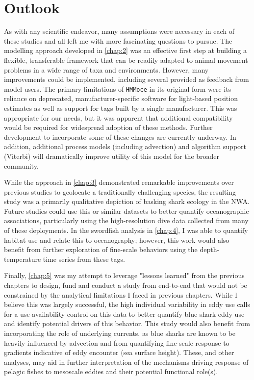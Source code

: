 \section{Outlook}
As with any scientific endeavor, many assumptions were necessary in each of these studies and all left me with more fascinating questions to pursue. The modelling approach developed in \cref{chap:2} was an effective first step at building a flexible, transferable framework that can be readily adapted to animal movement problems in a wide range of taxa and environments. However, many improvements could be implemented, including several provided as feedback from model users. The primary limitations of \texttt{HMMoce} in its original form were its reliance on deprecated, manufacturer-specific software for light-based position estimates as well as support for tags built by a single manufacturer. This was appropriate for our needs, but it was apparent that additional compatibility would be required for widespread adoption of these methods. Further development to incorporate some of these changes are currently underway. In addition, additional process models (\eg including advection) and algorithm support (\eg Viterbi) will dramatically improve utility of this model for the broader community.

While the approach in \cref{chap:3} demonstrated remarkable improvements over previous studies to geolocate a traditionally challenging species, the resulting study was a primarily qualitative depiction of basking shark ecology in the NWA. Future studies could use this or similar datasets to better quantify oceanographic associations, particularly using the high-resolution dive data collected from many of these deployments. In the swordfish analysis in \cref{chap:4}, I was able to quantify habitat use and relate this to oceanography; however, this work would also benefit from further exploration of fine-scale behaviors using the depth-temperature time series from these tags.

Finally, \cref{chap:5} was my attempt to leverage "lessons learned" from the previous chapters to design, fund and conduct a study from end-to-end that would not be constrained by the analytical limitations I faced in previous chapters. While I believe this was largely successful, the high individual variability in eddy use calls for a use-availability control on this data to better quantify blue shark eddy use and identify potential drivers of this behavior. This study would also benefit from incorporating the role of underlying currents, as blue sharks are known to be heavily influenced by advection \citep[\eg][]{Carey1990} and from quantifying fine-scale response to gradients indicative of eddy encounter (\eg sea surface height). These, and other analyses, may aid in further interpretation of the mechanisms driving response of pelagic fishes to mesoscale eddies and their potential functional role(s).



